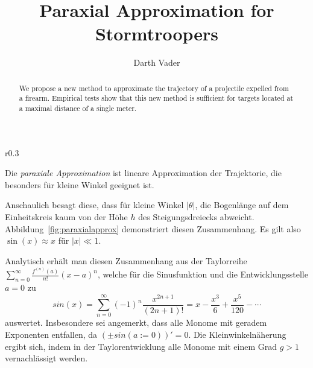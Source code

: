 \documentclass{article}
\begin{document}
\title{Paraxial Approximation for Stormtroopers}

\author{Darth Vader}

\date{}

\maketitle

\begin{abstract}
We propose a new method to approximate the trajectory of a projectile expelled
from a firearm. Empirical tests show that this new method is sufficient for
targets located at a maximal distance of a single meter.
\end{abstract}

\begin{wrapfigure}{r}{0.3\textwidth}
	\vspace{-15pt}
	\captionsetup{
	        format=plain,
	        font=footnotesize
	}
	\begin{center}
	\def\svgwidth{\linewidth}
	
	\caption{Geometrische Interpretation der Kleinwinkelnäherung. Für kleine
	Winkel ist $y\approx \theta$.}
	\label{fig:paraxialapprox}
	\end{center}
	\vspace{-20pt}
\end{wrapfigure}

Die \textit{paraxiale Approximation} ist lineare Approximation der Trajektorie,
die besonders für kleine Winkel geeignet ist.

Anschaulich besagt diese, dass für kleine Winkel $|\theta|$, die Bogenlänge auf
dem Einheitskreis kaum von der Höhe $h$ des Steigungsdreiecks abweicht.
Abbildung~\ref{fig:paraxialapprox} demonstriert diesen Zusammenhang. Es gilt
also $\sin(x) \approx x$ für $|x| \ll 1$.

Analytisch erhält man diesen Zusammenhang aus der Taylorreihe
$\sum_{n=0}^\infty  \frac{f^{(n)}(a)}{n!} (x-a)^n$, welche für die
Sinusfunktion und die Entwicklungsstelle $a=0$ zu $$
sin(x) = \sum_{n=0}^\infty (-1)^n \frac{x^{2n+1}}{(2n+1)!} = x - \frac{x^3}{6} + \frac{x^5}{120} - \cdots
$$ auswertet. Insbesondere sei angemerkt, dass alle Monome mit geradem
Exponenten entfallen, da $(\pm sin(a := 0))' = 0$. Die Kleinwinkelnäherung ergibt
sich, indem in der Taylorentwicklung alle Monome mit einem Grad $g > 1$
vernachlässigt werden.
\end{document}
